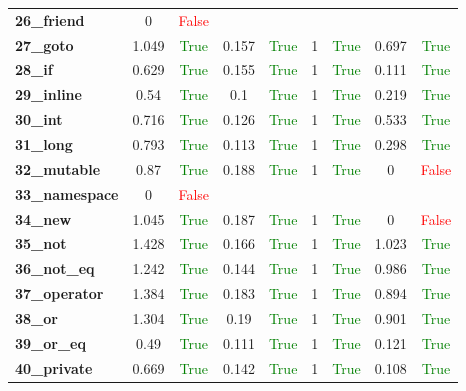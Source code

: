 \documentclass{article}
\begin{document}
\begin{xltabular}{\textwidth}{lcccccccc}
\textbf{26\_friend}& 0&\textcolor{red}{False} \\[0.5ex]
\textbf{27\_goto}& 1.049&\textcolor{green}{True}& 0.157&\textcolor{green}{True}& 1&\textcolor{green}{True}& 0.697&\textcolor{green}{True} \\[0.5ex]
\textbf{28\_if}& 0.629&\textcolor{green}{True}& 0.155&\textcolor{green}{True}& 1&\textcolor{green}{True}& 0.111&\textcolor{green}{True} \\[0.5ex]
\textbf{29\_inline}& 0.54&\textcolor{green}{True}& 0.1&\textcolor{green}{True}& 1&\textcolor{green}{True}& 0.219&\textcolor{green}{True} \\[0.5ex]
\textbf{30\_int}& 0.716&\textcolor{green}{True}& 0.126&\textcolor{green}{True}& 1&\textcolor{green}{True}& 0.533&\textcolor{green}{True} \\[0.5ex]
\textbf{31\_long}& 0.793&\textcolor{green}{True}& 0.113&\textcolor{green}{True}& 1&\textcolor{green}{True}& 0.298&\textcolor{green}{True} \\[0.5ex]
\textbf{32\_mutable}& 0.87&\textcolor{green}{True}& 0.188&\textcolor{green}{True}& 1&\textcolor{green}{True}& 0&\textcolor{red}{False} \\[0.5ex]
\textbf{33\_namespace}& 0&\textcolor{red}{False} \\[0.5ex]
\textbf{34\_new}& 1.045&\textcolor{green}{True}& 0.187&\textcolor{green}{True}& 1&\textcolor{green}{True}& 0&\textcolor{red}{False} \\[0.5ex]
\textbf{35\_not}& 1.428&\textcolor{green}{True}& 0.166&\textcolor{green}{True}& 1&\textcolor{green}{True}& 1.023&\textcolor{green}{True} \\[0.5ex]
\textbf{36\_not\_eq}& 1.242&\textcolor{green}{True}& 0.144&\textcolor{green}{True}& 1&\textcolor{green}{True}& 0.986&\textcolor{green}{True} \\[0.5ex]
\textbf{37\_operator}& 1.384&\textcolor{green}{True}& 0.183&\textcolor{green}{True}& 1&\textcolor{green}{True}& 0.894&\textcolor{green}{True} \\[0.5ex]
\textbf{38\_or}& 1.304&\textcolor{green}{True}& 0.19&\textcolor{green}{True}& 1&\textcolor{green}{True}& 0.901&\textcolor{green}{True} \\[0.5ex]
\textbf{39\_or\_eq}& 0.49&\textcolor{green}{True}& 0.111&\textcolor{green}{True}& 1&\textcolor{green}{True}& 0.121&\textcolor{green}{True} \\[0.5ex]
\textbf{40\_private}& 0.669&\textcolor{green}{True}& 0.142&\textcolor{green}{True}& 1&\textcolor{green}{True}& 0.108&\textcolor{green}{True} \\[0.5ex]

\end{xltabular}
\end{document}
